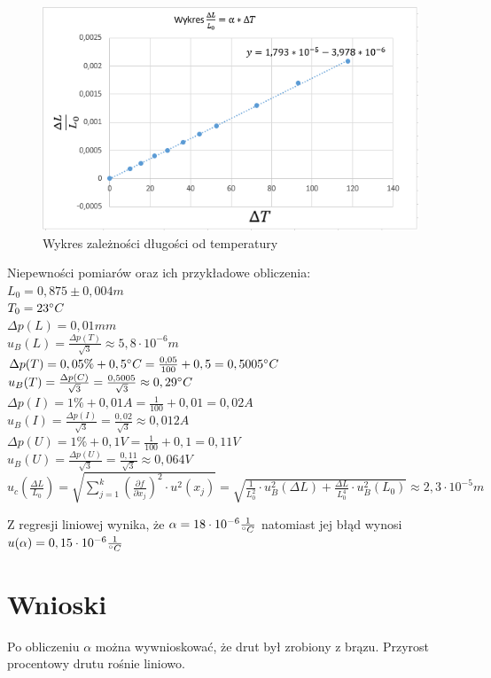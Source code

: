 \documentclass{article}
\begin{document}
\begin{figure}[h!]
    \centering
    \includegraphics[scale=0.9]{lolo.PNG}
    \caption{Wykres zależności długości od temperatury}
\end{figure}
Niepewności pomiarów oraz ich przykładowe obliczenia:\\

$L_{0}=0,875\pm0,004m$\\

$T_{0}=23\degree C$\\

$\Delta p(L)=0,01mm$\\

$u_{B}(L)=\frac{\Delta p(T)}{\sqrt{3}}\approx5,8\cdot10^{-6}m$\\

$\Delta p(T)=0,05\%+0,5\degree C=\frac{0,05}{100}+0,5=0,5005\degree C$\\

$u_{B}(T)=\frac{\Delta p(C)}{\sqrt{3}}=\frac{0,5005}{\sqrt{3}}\approx0,29\degree C$\\

$\Delta p(I)=1\%+0,01A=\frac{1}{100}+0,01=0,02A$\\

$u_{B}(I)=\frac{\Delta p(I)}{\sqrt{3}}=\frac{0,02}{\sqrt{3}}\approx0,012A$\\

$\Delta p(U)=1\%+0,1V=\frac{1}{100}+0,1=0,11V$\\

$u_{B}(U)=\frac{\Delta p(U)}{\sqrt{3}}=\frac{0,11}{\sqrt{3}}\approx0,064V$\\

$u_{c}\left(\frac{\Delta L}{L_{0}}\right)=\sqrt{\sum^{k}_{j=1}\left(\frac{\partial f}{\partial x_{j}}\right)^{2}\cdot u^{2}(x_{j})}= 
\sqrt{\frac{1}{L_{0}^2}\cdot u_{B}^2(\Delta L)+\frac{\Delta L}{L_{0}^4}\cdot u_{B}^2(L_{0})}\approx 2,3\cdot 10^{-5}m$
\vspace{2.5ex}

Z regresji liniowej wynika, że $\alpha=18\cdot10^{-6}\frac{1}{\degree C}$ natomiast jej błąd wynosi $u(\alpha)=0,15\cdot10^{-6}\frac{1}{\degree C}$
\section{Wnioski}
Po obliczeniu $\alpha$ można wywnioskować, że drut był zrobiony z brązu. Przyrost procentowy drutu rośnie liniowo. 
\end{document}
